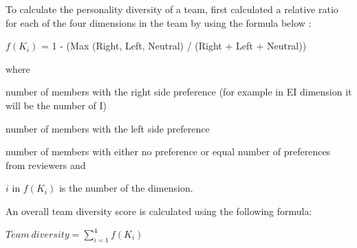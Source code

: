 To calculate the personality diversity of a team, first calculated a relative ratio for each of the four dimensions in the team by using the formula below :

$f(K_i)$ = 1 - (Max (Right, Left, Neutral) / (Right + Left + Neutral))

where 
\begin{description}
\item[Right =] number of members with the right side preference (for example in EI dimension it will be the number of I)
\item[Left =] number of members with the left side preference
\item[Neutral =] number of members with either no preference or equal number of preferences from reviewers and
\item $i$ in $f(K_i)$ is the number of the dimension.
\end{description}

An overall team diversity score is calculated using the following formula:

$Team\ diversity = \sum\limits_{i=1}^4 f(K_i)$